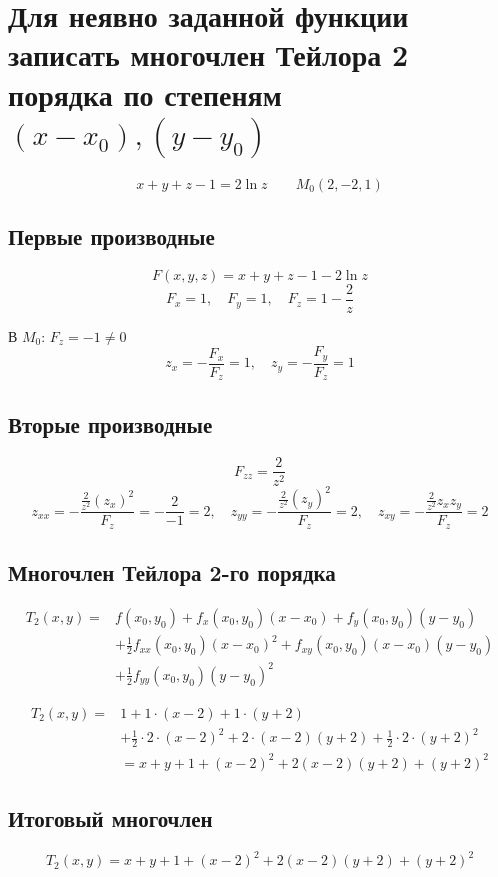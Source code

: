 \section{Для неявно заданной функции записать многочлен Тейлора 2 порядка по
степеням $(x − x_0), (y − y_0)$}

\[
x + y + z - 1 = 2 \ln z \quad \quad M_0(2, -2, 1)
\]

\subsection{Первые производные}
\[
F(x,y,z) = x + y + z - 1 - 2 \ln z
\]
\[
F_x = 1, \quad F_y = 1, \quad F_z = 1 - \frac{2}{z}
\]

В $M_0$: $F_z = -1 \neq 0$ \\

\[
z_x = -\frac{F_x}{F_z} = 1, \quad z_y = -\frac{F_y}{F_z} = 1
\]


\subsection{Вторые производные}
\[
F_{zz} = \frac{2}{z^2}
\]
\[
z_{xx} = -\frac{\frac{2}{z^2}(z_x)^2}{F_z} = -\frac{2}{-1} = 2, \quad
z_{yy} = -\frac{\frac{2}{z^2}(z_y)^2}{F_z} = 2, \quad
z_{xy} = -\frac{\frac{2}{z^2}z_x z_y}{F_z} = 2
\]


\subsection{Многочлен Тейлора 2-го порядка}

\begin{align*}
T_2(x,y) = & f(x_0,y_0) + f_x(x_0,y_0)(x-x_0) + f_y(x_0,y_0)(y-y_0) \\
& + \frac{1}{2}f_{xx}(x_0,y_0)(x-x_0)^2 + f_{xy}(x_0,y_0)(x-x_0)(y-y_0) \\
& + \frac{1}{2}f_{yy}(x_0,y_0)(y-y_0)^2
\end{align*}

\begin{align*}
T_2(x,y) = & 1 + 1\cdot(x-2) + 1\cdot(y+2) \\
& + \frac{1}{2}\cdot 2\cdot(x-2)^2 + 2\cdot(x-2)(y+2) + \frac{1}{2}\cdot 2\cdot(y+2)^2 \\
& = x + y + 1 + (x-2)^2 + 2(x-2)(y+2) + (y+2)^2
\end{align*}

\subsection{Итоговый многочлен}

\[
\boxed{T_2(x,y) = x + y + 1 + (x-2)^2 + 2(x-2)(y+2) + (y+2)^2}
\]